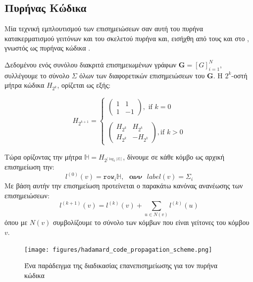 \subsection{Πυρήνας Κώδικα }
\label{ssec:hc}
Μία τεχνική εμπλουτισμού των επισημειώσεων σαν αυτή του πυρήνα κατακερματισμού γειτόνων και του σκελετού πυρήνα  και, εισήχθη από τους  και  στο \cite{Kataoka}, γνωστός ως πυρήνας κώδικα .\par
Δεδομένου ενός συνόλου διακριτά επισημειωμένων γράφων $\mathbf{G}=[G]^{N}_{i=1}$, συλλέγουμε το σύνολο $\Sigma$ όλων των διαφορετικών επισημειώσεων του $\mathbf{G}$.
Η $2^{k}$-οστή μήτρα κώδικα  $H_{2^{k}}$, ορίζεται ως εξής:

\begin{equation}
H_{2^{k+1}}= \begin{cases}
\begin{pmatrix}
    1 & 1\\
    1 & -1
\end{pmatrix},\text{ if }k = 0
\\\\
\begin{pmatrix}
    H_{2^{k}} & H_{2^{k}}\\
    H_{2^{k}} & -H_{2^{k}}
\end{pmatrix},\text{if } k > 0
\end{cases}
\end{equation}

Τώρα ορίζοντας την μήτρα  $\mathbb{H} = H_{2^{\lceil \log_{2}|\Sigma|\rceil}}$, δίνουμε σε κάθε κόμβο ως αρχική επισημείωση την:
\begin{equation}
l^{(0)}(v) = \mathtt{row}_{i}\mathbb{H},\text{ }\textbf{ανν}\text{ }label(v) = \Sigma_{i}
\end{equation}
Με βάση αυτήν την επισημείωση προτείνεται ο παρακάτω κανόνας ανανέωσης των επισημειώσεων:
\begin{equation}
l^{(k+1)}(v) = l^{(k)}(v) + \sum_{u \in N(v)}l^{(k)}(u)
\end{equation}
όπου με $N(v)$ συμβολίζουμε το σύνολο των κόμβων που είναι γείτονες του κόμβου $v$.

\begin{figure}[]
\centering
\texttt{[image: figures/hadamard\_code\_propagation\_scheme.png]}
\caption{Ένα παράδειγμα της διαδικασίας επανεπισημείωσης για τον πυρήνα κώδικα }
\label{fig:hd_ps}
\end{figure}

